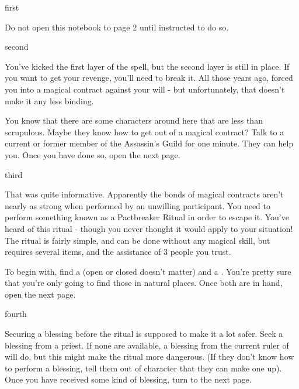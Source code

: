 \documentclass[greennotebook]{NeptuneBall}
\begin{document}


\startnotebook{\nSpellBreakNotebook{}}

\begin{page}{first}

Do not open this notebook to page 2 until instructed to do so.


\end{page}

\begin{page}{second}

You've kicked the first layer of the spell, but the second layer is still in place. If you want to get your revenge, you'll need to break it. All those years ago, \cWitch{} forced you into a magical contract against your will - but unfortunately, that doesn't make it any less binding.

You know that there are some characters around here that are less than scrupulous. Maybe they know how to get out of a magical contract? Talk to a current or former member of the Assassin's Guild for one minute. They can help you. Once you have done so, open the next page.

\end{page}

\begin{page}{third}

That was quite informative. Apparently the bonds of magical contracts aren't nearly as strong when performed by an unwilling participant. You need to perform something known as a Pactbreaker Ritual in order to escape it. You've heard of this ritual - though you never thought it would apply to your situation! The ritual is fairly simple, and can be done without any magical skill, but requires several items, and the assistance of 3 people you trust.

To begin with, find a \iClam{} (open or closed doesn't matter) and a \iSeaFan{}. You're pretty sure that you're only going to find those in natural places. Once both are in hand, open the next page.

\end{page}

\begin{page}{fourth}

Securing a blessing before the ritual is supposed to make it a lot safer. Seek a blessing from a priest. If none are available, a blessing from the current ruler of \pAtlantis{} will do, but this might make the ritual more dangerous. (If they don't know how to perform a blessing, tell them out of character that they can make one up). Once you have received some kind of blessing, turn to the next page.

\end{page}
\end{document}
